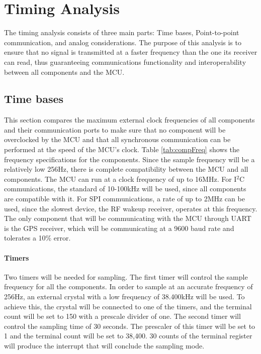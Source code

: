 \section{Timing Analysis}
The timing analysis consists of three main parts: Time bases, Point-to-point communication, and analog considerations. The purpose of this analysis is to ensure that no signal is transmitted at a faster frequency than the one its receiver can read, thus guaranteeing communications functionality and interoperability between all components and the MCU.

\subsection{Time bases}
This section compares the maximum external clock frequencies of all components and their communication ports to make sure that no component will be overclocked by the MCU and that all synchronous communication can be performed at the speed of the MCU's clock. Table \ref{tab:compFreq} shows the frequency specifications for the components.  Since the sample frequency will be a relatively low 256Hz, there is complete compatibility between the MCU and all components. The MCU can run at a clock frequency of up to 16MHz. For I$^2$C communications, the standard of 10-100kHz will be used, since all components are compatible with it. For SPI communications, a rate of up to 2MHz can be used, since the slowest device, the RF wakeup receiver, operates at this frequency. The only component that will be communicating with the MCU through UART is the GPS receiver, which will be communicating at a 9600 baud rate and tolerates a 10\% error.

\paragraph{Timers}

Two timers will be needed for sampling. The first timer will control the sample frequency for all the components.  In order to sample at an accurate frequency of 256Hz, an external crystal with a low frequency of 38.400kHz will be used. To achieve this, the crystal will be connected to one of the timers, and the terminal count will be set to 150 with a prescale divider of one. The second timer will control the sampling time of 30 seconds. The prescaler of this timer will be set to 1 and the terminal count will be set to 38,400. 30 counts of the terminal register will produce the interrupt that will conclude the sampling mode.


